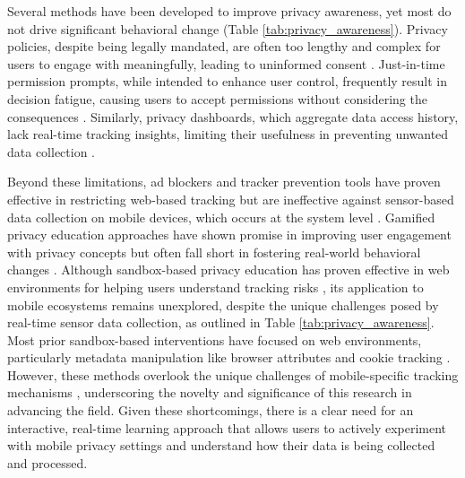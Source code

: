 \documentclass[acmlarge, nonacm]{acmart}
\begin{document}
Several methods have been developed to improve privacy awareness, yet most do not drive significant behavioral change (Table \ref{tab:privacy_awareness}). Privacy policies, despite being legally mandated, are often too lengthy and complex for users to engage with meaningfully, leading to uninformed consent \cite{burkhardt2023privacy}. Just-in-time permission prompts, while intended to enhance user control, frequently result in decision fatigue, causing users to accept permissions without considering the consequences \cite{bilogrevic2021shhh}. Similarly, privacy dashboards, which aggregate data access history, lack real-time tracking insights, limiting their usefulness in preventing unwanted data collection \cite{narayanan2024real}.

Beyond these limitations, ad blockers and tracker prevention tools have proven effective in restricting web-based tracking but are ineffective against sensor-based data collection on mobile devices, which occurs at the system level \cite{bian2021supply}. Gamified privacy education approaches have shown promise in improving user engagement with privacy concepts but often fall short in fostering real-world behavioral changes \cite{idierukevbe2024bridging}. Although sandbox-based privacy education has proven effective in web environments for helping users understand tracking risks \cite{Chaoran2023EmpathySandbox}, its application to mobile ecosystems remains unexplored, despite the unique challenges posed by real-time sensor data collection, as outlined in Table \ref{tab:privacy_awareness}. Most prior sandbox-based interventions have focused on web environments, particularly metadata manipulation like browser attributes and cookie tracking \cite{van2024we}. However, these methods overlook the unique challenges of mobile-specific tracking mechanisms \cite{bella}, underscoring the novelty and significance of this research in advancing the field. Given these shortcomings, there is a clear need for an interactive, real-time learning approach that allows users to actively experiment with mobile privacy settings and understand how their data is being collected and processed.
\end{document}
